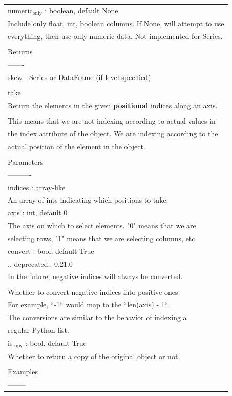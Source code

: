 \documentclass[11pt]{article}
\begin{document}
\begin{enumerate}
\begin{enumerate}
\begin{enumerate}
\begin{center}
\begin{tabular}{l}
numeric\(_{\text{only}}\) : boolean, default None\\
Include only float, int, boolean columns. If None, will attempt to use\\
everything, then use only numeric data. Not implemented for Series.\\
\\
Returns\\
-------\\
skew : Series or DataFrame (if level specified)\\
\\
take\\
Return the elements in the given \textbf{positional} indices along an axis.\\
\\
This means that we are not indexing according to actual values in\\
the index attribute of the object. We are indexing according to the\\
actual position of the element in the object.\\
\\
Parameters\\
----------\\
indices : array-like\\
An array of ints indicating which positions to take.\\
axis : int, default 0\\
The axis on which to select elements. "0" means that we are\\
selecting rows, "1" means that we are selecting columns, etc.\\
convert : bool, default True\\
.. deprecated:: 0.21.0\\
In the future, negative indices will always be converted.\\
\\
Whether to convert negative indices into positive ones.\\
For example, ``-1`` would map to the ``len(axis) - 1``.\\
The conversions are similar to the behavior of indexing a\\
regular Python list.\\
is\(_{\text{copy}}\) : bool, default True\\
Whether to return a copy of the original object or not.\\
\\
Examples\\
--------\\

\end{tabular}
\end{center}
\end{enumerate}
\end{enumerate}
\end{enumerate}
\end{document}

